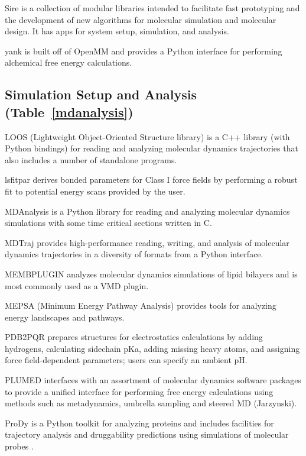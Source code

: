 Sire is a collection of modular libraries intended to facilitate fast prototyping and the development of new algorithms for molecular simulation and molecular design. It has apps for system setup, simulation, and analysis.

yank is built off of OpenMM and provides a Python interface for performing alchemical free energy calculations.

\subsection*{Simulation Setup and Analysis (Table~\ref{mdanalysis})}

LOOS (Lightweight Object-Oriented Structure library) \cite{Romo_2014} is a C++ library (with Python bindings) for reading and analyzing molecular dynamics trajectories that also includes a number of standalone programs.

lsfitpar \cite{Vanommeslaeghe_2015} derives bonded parameters for Class I force fields by performing a robust fit to potential energy scans provided by the user.

MDAnalysis  \cite{Michaud_Agrawal_2011} is a Python library for reading and analyzing molecular dynamics simulations with some time critical sections written in C.

MDTraj \cite{McGibbon_2015} provides high-performance reading, writing, and analysis of molecular dynamics trajectories in a diversity of formats from a Python interface.

MEMBPLUGIN \cite{Guixa-Gonzalez_2014} analyzes molecular dynamics simulations of lipid bilayers and is most commonly used as a VMD plugin.

MEPSA (Minimum Energy Pathway Analysis) \cite{Marcos_Alcalde_2015} provides tools for analyzing energy landscapes and pathways.

PDB2PQR \cite{Dolinsky_2007} prepares structures for electrostatics calculations by adding hydrogens, calculating sidechain pKa, adding missing heavy atoms, and assigning force field-dependent parameters; users can specify an ambient pH.

PLUMED \cite{Tribello_2014} interfaces with an assortment of molecular dynamics software packages to provide a unified interface for performing free energy calculations using methods such as metadynamics, umbrella sampling and steered MD (Jarzynski).

ProDy \cite{Bakan_2011} is a Python toolkit for analyzing proteins and includes facilities for trajectory analysis and druggability predictions using simulations of molecular probes \cite{Bakan_2012}.

